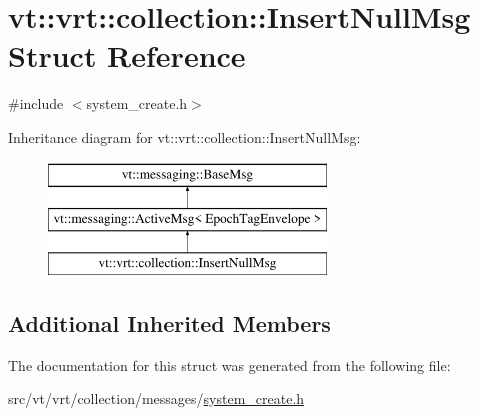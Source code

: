\hypertarget{structvt_1_1vrt_1_1collection_1_1_insert_null_msg}{}\section{vt\+:\+:vrt\+:\+:collection\+:\+:Insert\+Null\+Msg Struct Reference}
\label{structvt_1_1vrt_1_1collection_1_1_insert_null_msg}


{\ttfamily \#include $<$system\+\_\+create.\+h$>$}

Inheritance diagram for vt\+:\+:vrt\+:\+:collection\+:\+:Insert\+Null\+Msg\+:\begin{figure}[H]
\begin{center}
\leavevmode
\includegraphics[height=3.000000cm]{structvt_1_1vrt_1_1collection_1_1_insert_null_msg}
\end{center}
\end{figure}
\subsection*{Additional Inherited Members}


The documentation for this struct was generated from the following file\+:\begin{DoxyCompactItemize}
\item 
src/vt/vrt/collection/messages/\hyperlink{system__create_8h}{system\+\_\+create.\+h}\end{DoxyCompactItemize}
